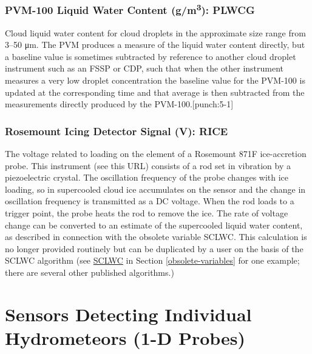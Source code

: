 \documentclass[
  english,
]{book}
\begin{document}
\hypertarget{plwcg}{%
\subsubsection*{\texorpdfstring{PVM-100 Liquid Water Content (g/m\textsuperscript{3}): PLWCG}{PVM-100 Liquid Water Content (g/m3): PLWCG}}\label{plwcg}}

Cloud liquid water content for cloud droplets in the approximate size range from 3--50 {μ}m. The PVM produces a measure of the liquid water content directly, but a baseline value is sometimes subtracted by reference to another cloud droplet instrument such as an FSSP or CDP, such that when the other instrument measures a very low droplet concentration the baseline value for the PVM-100 is updated at the corresponding time and that average is then subtracted from the measurements directly produced by the PVM-100.\protect\hypertarget{punch:5-1}{}{{[}punch:5-1{]}}

\hypertarget{rice}{%
\subsubsection*{Rosemount Icing Detector Signal (V): RICE}\label{rice}}

The voltage related to loading on the element of a Rosemount 871F ice-accretion probe. This instrument (see this URL) consists of a rod set in vibration by a piezoelectric crystal. The oscillation frequency of the probe changes with ice loading, so in supercooled cloud ice accumulates on the sensor and the change in oscillation frequency is transmitted as a DC voltage. When the rod loads to a trigger point, the probe heats the rod to remove the ice. The rate of voltage change can be converted to an estimate of the supercooled liquid water content, as described in connection with the obsolete variable SCLWC. This calculation is no longer provided routinely but can be duplicated by a user on the basis of the SCLWC algorithm (see \protect\hyperlink{SCLWC}{SCLWC} in Section \ref{obsolete-variables} for one example; there are several other published algorithms.)

\hypertarget{sensors-1-D-probes}{%
\section{Sensors Detecting Individual Hydrometeors (1-D Probes)}\label{sensors-1-D-probes}}
\end{document}
